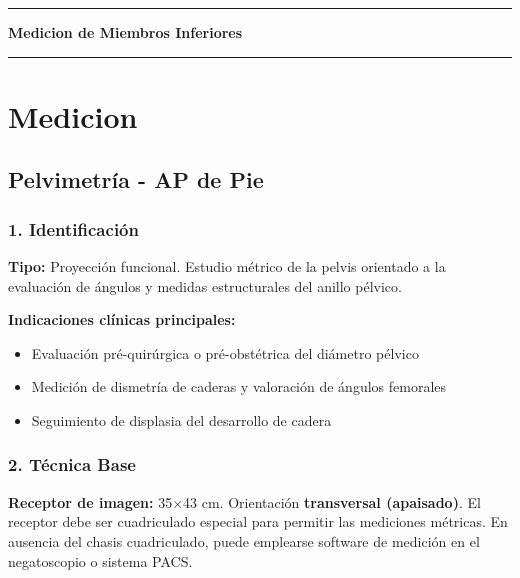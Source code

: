 \clearpage
\onecolumn
\thispagestyle{empty}
\vspace*{\fill}
\begin{center}
	{\color{radblue}\rule{\linewidth}{2pt}}\par
	\vspace{6mm}
	{\Huge\bfseries\color{radblue} Medicion de Miembros Inferiores}\par
	\vspace{6mm}
	{\color{radblue}\rule{\linewidth}{2pt}}
\end{center}
\vspace*{\fill}
\clearpage
\twocolumn
\pagestyle{contenido}

	
	\section{Medicion}
	
	\subsection{Pelvimetría - AP de Pie}
	
	\subsubsection*{1. Identificación}
	
	\textbf{Tipo:} Proyección funcional. Estudio métrico de la pelvis orientado a la evaluación de ángulos y medidas estructurales del anillo pélvico.
	
	\textbf{Indicaciones clínicas principales:}
	\begin{itemize}
		\item Evaluación pré-quirúrgica o pré-obstétrica del diámetro pélvico
		\item Medición de dismetría de caderas y valoración de ángulos femorales
		\item Seguimiento de displasia del desarrollo de cadera
	\end{itemize}
	
	\subsubsection*{2. Técnica Base}
	
	\textbf{Receptor de imagen:} 35$\times$43 cm. Orientación \textbf{transversal (apaisado)}. El receptor debe ser cuadriculado especial para permitir las mediciones métricas. En ausencia del chasis cuadriculado, puede emplearse software de medición en el negatoscopio o sistema PACS.
	
